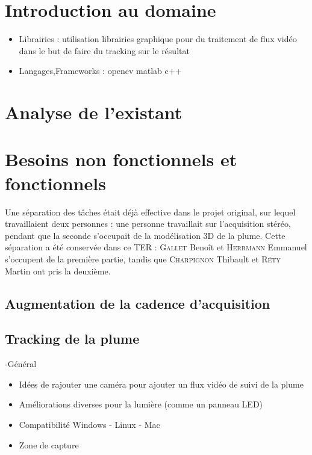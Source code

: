 \documentclass{article}
\begin{document}
\section{Introduction au domaine}
\begin{itemize}
\item Librairies : utilisation librairies graphique pour du traitement de flux vidéo dans le but de faire du tracking sur le résultat
\item Langages,Frameworks : opencv matlab c++
\end{itemize}

\section{Analyse de l'existant}



\section{Besoins non fonctionnels et fonctionnels}

	Une séparation des tâches était déjà effective dans le projet original, sur lequel travaillaient deux personnes : une personne travaillait sur l'acquisition stéréo, pendant que la seconde s'occupait de la modélisation 3D de la plume. Cette séparation a été conservée dans ce TER : \textsc{Gallet} Benoît et \textsc{Herrmann} Emmanuel s'occupent de la première partie, tandis que \textsc{Charpignon} Thibault et \textsc{Réty} Martin ont pris la deuxième.

\subsection{Augmentation de la cadence d'acquisition}



\subsection{Tracking de la plume}



-Général
\begin{itemize}
\item Idées de rajouter une caméra pour ajouter un flux vidéo de suivi de la plume
\item Améliorations diverses pour la lumière (comme un panneau LED)
\item Compatibilité Windows - Linux - Mac
\item Zone de capture
\end{itemize}
\end{document}
